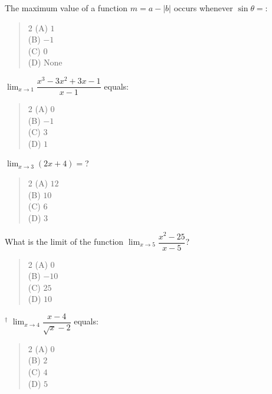 \documentclass[11pt,a4paper]{article}
\begin{document}
\begin{mcqlist}
\item The maximum value of a function $m=a-|b|$ occurs whenever $\sin\theta=$:
\begin{quote}\begin{multicols}{2}
\noindent (A) $1$ \\
(B) $-1$ \\
(C) $0$ \\
(D) None
\end{multicols}\end{quote}

\item $\displaystyle\lim_{x\to1}\dfrac{x^3-3x^2+3x-1}{x-1}$ equals:
\begin{quote}\begin{multicols}{2}
\noindent (A) $0$ \\
(B) $-1$ \\
(C) $3$ \\
(D) $1$
\end{multicols}\end{quote}

\item $\displaystyle\lim_{x\to3}(2x+4) = $?
\begin{quote}\begin{multicols}{2}
\noindent (A) $12$ \\
(B) $10$ \\
(C) $6$ \\
(D) $3$
\end{multicols}\end{quote}

\item What is the limit of the function $\displaystyle\lim_{x\to5}\dfrac{x^2-25}{x-5}$?
\begin{quote}\begin{multicols}{2}
\noindent (A) $0$ \\
(B) $-10$ \\
(C) $25$ \\
(D) $10$
\end{multicols}\end{quote}

\item $^{\dagger}$ $\displaystyle\lim_{x\to4}\dfrac{x-4}{\sqrt{x}-2}$ equals:
\begin{quote}\begin{multicols}{2}
\noindent (A) $0$ \\
(B) $2$ \\
(C) $4$ \\
(D) $5$
\end{multicols}\end{quote}


\end{mcqlist}
\end{document}
